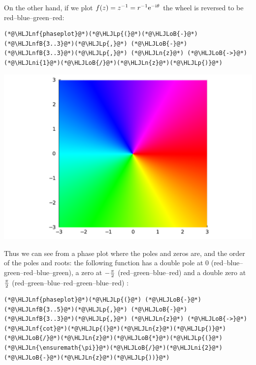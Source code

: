 \documentclass[12pt,a4paper]{article}
\newcommand{\HLJLn}[1]{#1}
\newcommand{\HLJLnf}[1]{\textcolor[RGB]{66,102,213}{#1}}
\newcommand{\HLJLnfB}[1]{\textcolor[RGB]{59,151,46}{#1}}
\newcommand{\HLJLni}[1]{\textcolor[RGB]{59,151,46}{#1}}
\newcommand{\HLJLoB}[1]{\textcolor[RGB]{102,102,102}{\textbf{#1}}}
\newcommand{\HLJLp}[1]{#1}
\def\I{ {\rm i} }
\def\E{ {\rm e} }
\def\endash{–}
\begin{document}
On the other hand, if we plot $f(z) = z^{-1} = r^{-1} \E^{-\I \theta}$ the wheel is reversed to  be red\ensuremath{\endash}blue\ensuremath{\endash}green\ensuremath{\endash}red:


\begin{lstlisting}
(*@\HLJLnf{phaseplot}@*)(*@\HLJLp{(}@*)(*@\HLJLoB{-}@*)(*@\HLJLnfB{3..3}@*)(*@\HLJLp{,}@*) (*@\HLJLoB{-}@*)(*@\HLJLnfB{3..3}@*)(*@\HLJLp{,}@*) (*@\HLJLn{z}@*) (*@\HLJLoB{->}@*) (*@\HLJLni{1}@*)(*@\HLJLoB{/}@*)(*@\HLJLn{z}@*)(*@\HLJLp{)}@*)
\end{lstlisting}

\includegraphics[width=\linewidth]{jl_z7eR69/Lecture1_9_1.pdf}

Thus we can see from a phase plot where the poles and zeros are, and the order of the poles and roots: the following function has a double pole at 0 (red\ensuremath{\endash}blue\ensuremath{\endash}green\ensuremath{\endash}red\ensuremath{\endash}blue\ensuremath{\endash}green), a zero at $-{\pi \over 2}$ (red\ensuremath{\endash}green\ensuremath{\endash}blue\ensuremath{\endash}red) and a double zero at $\pi\over 2$ (red\ensuremath{\endash}green\ensuremath{\endash}blue\ensuremath{\endash}red\ensuremath{\endash}green\ensuremath{\endash}blue\ensuremath{\endash}red) :


\begin{lstlisting}
(*@\HLJLnf{phaseplot}@*)(*@\HLJLp{(}@*) (*@\HLJLoB{-}@*)(*@\HLJLnfB{3..5}@*)(*@\HLJLp{,}@*) (*@\HLJLoB{-}@*)(*@\HLJLnfB{3..3}@*)(*@\HLJLp{,}@*) (*@\HLJLn{z}@*) (*@\HLJLoB{->}@*) (*@\HLJLnf{cot}@*)(*@\HLJLp{(}@*)(*@\HLJLn{z}@*)(*@\HLJLp{)}@*)(*@\HLJLoB{/}@*)(*@\HLJLn{z}@*)(*@\HLJLoB{*}@*)(*@\HLJLp{(}@*)(*@\HLJLn{\ensuremath{\pi}}@*)(*@\HLJLoB{/}@*)(*@\HLJLni{2}@*)(*@\HLJLoB{-}@*)(*@\HLJLn{z}@*)(*@\HLJLp{))}@*)
\end{lstlisting}
\end{document}

